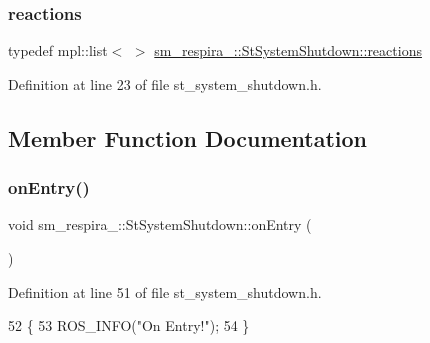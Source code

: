 \subsubsection{\texorpdfstring{reactions}{reactions}}
{\footnotesize\ttfamily typedef mpl\+::list$<$ $>$ \hyperlink{structsm__respira__1_1_1StSystemShutdown_ae6fd4a2dbf4f3a8aa45f21074254a24e}{sm\+\_\+respira\+\_\+::\+St\+System\+Shutdown\+::reactions}}



Definition at line 23 of file st\+\_\+system\+\_\+shutdown.\+h.



\subsection{Member Function Documentation}
\mbox{\label{structsm__respira__1_1_1StSystemShutdown_a1a1c466be4f427b79e0276ab7f38344a}} 
\subsubsection{\texorpdfstring{on\+Entry()}{onEntry()}}
{\footnotesize\ttfamily void sm\+\_\+respira\+\_\+::\+St\+System\+Shutdown\+::on\+Entry (\begin{DoxyParamCaption}{ }\end{DoxyParamCaption})\hspace{0.3cm}{\ttfamily [inline]}}



Definition at line 51 of file st\+\_\+system\+\_\+shutdown.\+h.


\begin{DoxyCode}
52     \{
53         ROS\_INFO(\textcolor{stringliteral}{"On Entry!"});
54     \}
\end{DoxyCode}
\mbox{\label{structsm__respira__1_1_1StSystemShutdown_adc045e262e894feb5f040f9d3e98764a}} 
